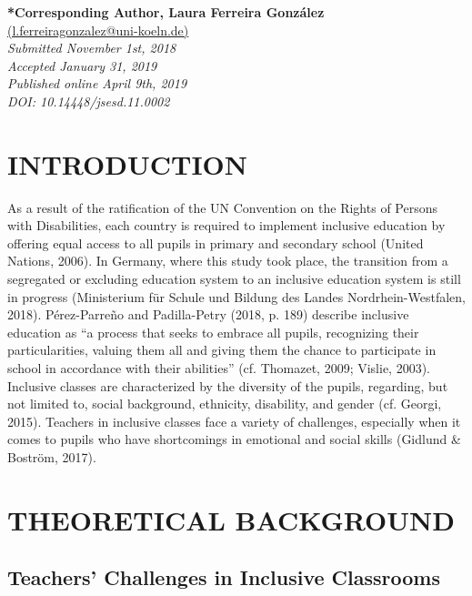 \documentclass[11.5pt]{sig-alternate} %
\begin{document}

\textbf{*Corresponding Author, Laura Ferreira González}\\
\href{mailto: l.ferreiragonzalez@uni-koeln.de }{(l.ferreiragonzalez@uni-koeln.de)} \\
\textit{Submitted November 1st, 2018 }\\
\textit{Accepted January 31, 2019} \\
\textit{Published online April 9th, 2019} \\
\textit{DOI: 10.14448/jsesd.11.0002} \\
\pagebreak
\clearpage

\begin{large}
\section*{INTRODUCTION}
    
As a result of the ratification of the UN Convention on the Rights of Persons with Disabilities, each country is required to implement inclusive education by offering equal access to all pupils in primary and secondary school (United Nations, 2006). In Germany, where this study took place, the transition from a segregated or excluding education system to an inclusive education system is still in progress (Ministerium für Schule und Bildung des Landes Nordrhein-Westfalen, 2018). Pérez-Parre\~no and Padilla-Petry (2018, p. 189) describe inclusive education as “a process that seeks to embrace all pupils, recognizing their particularities, valuing them all and giving them the chance to participate in school in accordance with their abilities” (cf. Thomazet, 2009; Vislie, 2003). Inclusive classes are characterized by the diversity of the pupils, regarding, but not limited to, social background, ethnicity, disability, and gender (cf. Georgi, 2015). Teachers in inclusive classes face a variety of challenges, especially when it comes to pupils who have shortcomings in emotional and social skills (Gidlund \& Boström, 2017).

\section*{THEORETICAL BACKGROUND}
\subsection*{Teachers' Challenges in Inclusive Classrooms}


\end{large}
\end{document}
